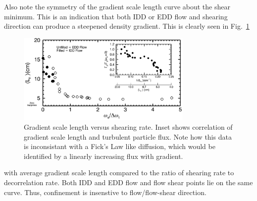 \documentclass[%
 aps,
 prl,
 amsmath,amssymb,
 reprint,%
]{revtex4-1}
\begin{document}
Also note the symmetry of the gradient scale length curve about the shear minimum. This is an indication that both IDD or EDD flow and shearing direction can produce a steepened density gradient. This is clearly seen in
Fig.~\ref{fig:shearandgrad}
\begin{figure}
\begin{center}
\includegraphics[width=8.5cm]{shearandgrad.pdf}%
\end{center}
\caption{\label{fig:shearandgrad} Gradient scale length versus shearing rate. Inset shows correlation of gradient scale length and turbulent particle flux. Note how this data is inconsistant with a Fick's Law like diffusion, which would be identified by a linearly increasing flux with gradient.}
\end{figure}
with average gradient scale length compared to the ratio of shearing rate to decorrelation rate. Both IDD and EDD flow and flow shear points lie on the same curve. Thus, confinement is insenstive to flow/flow-shear direction.
\end{document}
